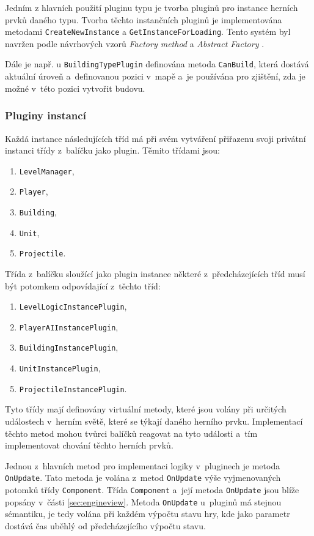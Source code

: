 Jedním z hlavních použití pluginu typu je tvorba pluginů pro instance herních prvků daného typu. Tvorba těchto instančních pluginů je implementována metodami \texttt{CreateNewInstance} a \texttt{GetInstanceForLoading}. Tento systém byl navržen podle návrhových vzorů \textit{Factory method} \citep[str.~107]{book:gangoffour} a \textit{Abstract Factory} \citep[str.~87]{book:gangoffour}.

Dále je např. u \texttt{BuildingTypePlugin} definována metoda \texttt{CanBuild}, která dostává aktuální úroveň a~definovanou pozici v~mapě a~je používána pro zjištění, zda je možné v~této pozici vytvořit budovu.

\subsubsection{Pluginy instancí}
Každá instance následujících tříd má při svém vytváření přiřazenu svoji privátní instanci třídy z~balíčku jako plugin. Těmito třídami jsou:
\begin{enumerate}
	\item\texttt{LevelManager}, 
	\item\texttt{Player}, 
	\item\texttt{Building},
	\item\texttt{Unit},
	\item\texttt{Projectile}.
\end{enumerate}
   
Třída z~balíčku sloužící jako plugin instance některé z~předcházejících tříd musí být potomkem odpovídající z~těchto tříd:

\begin{enumerate}
	\item\texttt{LevelLogicInstancePlugin}, 
	\item\texttt{PlayerAIInstancePlugin}, 
	\item\texttt{BuildingInstancePlugin}, 
	\item\texttt{UnitInstancePlugin}, 
	\item\texttt{ProjectileInstancePlugin}.
\end{enumerate}

Tyto třídy mají definovány virtuální metody, které jsou volány při určitých událostech v~herním světě, které se týkají daného herního prvku. Implementací těchto metod mohou tvůrci balíčků reagovat na tyto události a~tím implementovat chování těchto herních prvků.

Jednou z~hlavních metod pro implementaci logiky v~pluginech je metoda \texttt{OnUpdate}. Tato metoda je volána z~metod \texttt{OnUpdate} výše vyjmenovaných potomků třídy \texttt{Component}. Třída \texttt{Component} a~její metoda \texttt{OnUpdate} jsou blíže popsány v~části \ref{sec:engineview}. Metoda \texttt{OnUpdate} u~pluginů má stejnou sémantiku, je tedy volána při každém výpočtu stavu hry, kde jako parametr dostává čas uběhlý od předcházejícího výpočtu stavu.

